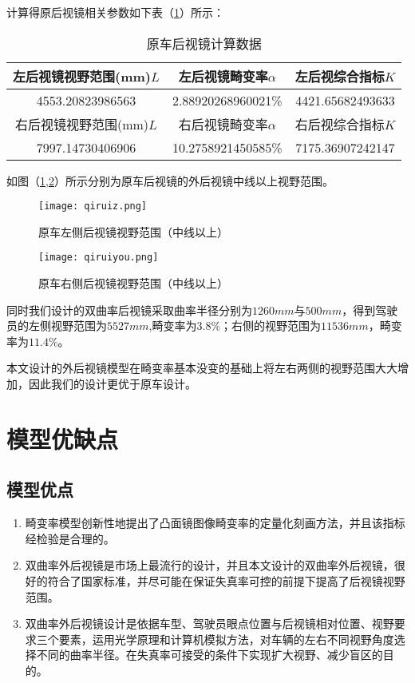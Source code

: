 \documentclass[withoutpreface,bwprint]{cumcmthesis} %
\begin{document}
计算得原后视镜相关参数如下表（\ref{原车后视镜计算数据}）所示：
\begin{table}[!htbp]
\centering
\caption{原车后视镜计算数据}
\label{原车后视镜计算数据}
\begin{tabular}{|c|c|c|}
\toprule
左后视镜视野范围(mm)$L$ & 左后视镜畸变率$\alpha$ & 左后视综合指标$K$ \\ \hline 
4553.20823986563 & 2.88920268960021\%  & 4421.65682493633 \\ \hline 


右后视镜视野范围(mm)$L$ & 右后视镜畸变率$\alpha$  & 右后视综合指标$K$ \\ \hline
7997.14730406906 & 10.2758921450585\%  &  7175.36907242147 \\

\bottomrule 
\end{tabular}

\end{table}
\par 如图（\ref{fig:qiruiz},\ref{fig:qiruiy}）所示分别为原车后视镜的外后视镜中线以上视野范围。

\begin{figure}[!htpb]
\small
\centering
\texttt{[image: qiruiz.png]}
\caption{原车左侧后视镜视野范围（中线以上）} \label{fig:qiruiz}
\end{figure}

\begin{figure}[!htpb]
\small
\centering
\texttt{[image: qiruiyou.png]}
\caption{原车右侧后视镜视野范围（中线以上）} \label{fig:qiruiy}
\end{figure}

\par 同时我们设计的双曲率后视镜采取曲率半径分别为$1260mm$与$500mm$，得到驾驶员的左侧视野范围为$5527mm$,畸变率为$3.8\%$；右侧的视野范围为$11536 mm$，畸变率为$11.4\%$。

\par 本文设计的外后视镜模型在畸变率基本没变的基础上将左右两侧的视野范围大大增加，因此我们的设计更优于原车设计。


\section{模型优缺点}
\subsection{模型优点}
\begin{enumerate}
	\item 畸变率模型创新性地提出了凸面镜图像畸变率的定量化刻画方法，并且该指标经检验是合理的。
	\item 双曲率外后视镜是市场上最流行的设计，并且本文设计的双曲率外后视镜，很好的符合了国家标准，并尽可能在保证失真率可控的前提下提高了后视镜视野范围。
	\item 双曲率外后视镜设计是依据车型、驾驶员眼点位置与后视镜相对位置、视野要求三个要素，运用光学原理和计算机模拟方法，对车辆的左右不同视野角度选择不同的曲率半径。在失真率可接受的条件下实现扩大视野、减少盲区的目的。
\end{enumerate}
\end{document}
